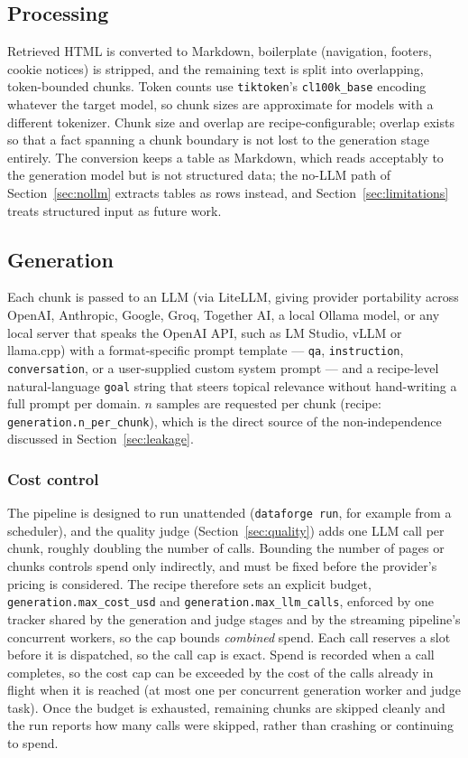 \documentclass[11pt]{article}
\begin{document}
\subsection{Processing}
\label{sec:processing}
Retrieved HTML is converted to Markdown, boilerplate (navigation,
footers, cookie notices) is stripped, and the remaining text is split
into overlapping, token-bounded chunks. Token counts use
\texttt{tiktoken}'s \texttt{cl100k\_base} encoding whatever the target
model, so chunk sizes are approximate for models with a different
tokenizer. Chunk size and overlap are recipe-configurable; overlap exists
so that a fact spanning a chunk boundary is not lost to the generation
stage entirely. The conversion keeps a table as Markdown, which reads
acceptably to the generation model but is not structured data; the
no-LLM path of Section~\ref{sec:nollm} extracts tables as rows instead,
and Section~\ref{sec:limitations} treats structured input as future
work.

\subsection{Generation}
\label{sec:generation}
Each chunk is passed to an LLM (via LiteLLM, giving provider portability
across OpenAI, Anthropic, Google, Groq, Together AI, a local Ollama
model, or any local server that speaks the OpenAI API, such as LM Studio,
vLLM or llama.cpp) with a format-specific prompt template --- \texttt{qa},
\texttt{instruction}, \texttt{conversation}, or a user-supplied custom
system prompt --- and a recipe-level natural-language \texttt{goal}
string that steers topical relevance without hand-writing a full prompt
per domain. $n$ samples are requested per chunk (recipe:
\texttt{generation.n\_per\_chunk}), which is the direct source of the
non-independence discussed in Section~\ref{sec:leakage}.

\subsubsection{Cost control}
\label{sec:budget}
The pipeline is designed to run unattended (\texttt{dataforge run}, for
example from a scheduler), and the quality judge (Section~\ref{sec:quality})
adds one LLM call per chunk, roughly doubling the number of calls. Bounding
the number of pages or chunks controls spend only indirectly, and must be
fixed before the provider's pricing is considered. The recipe therefore
sets an explicit budget, \texttt{generation.max\_cost\_usd} and
\texttt{generation.max\_llm\_calls}, enforced by one tracker shared by the
generation and judge stages and by the streaming pipeline's concurrent
workers, so the cap bounds \emph{combined} spend. Each call reserves a
slot before it is dispatched, so the call cap is exact. Spend is recorded
when a call completes, so the cost cap can be exceeded by the cost of the
calls already in flight when it is reached (at most one per concurrent
generation worker and judge task). Once the budget is exhausted, remaining
chunks are skipped cleanly and the run reports how many calls were
skipped, rather than crashing or continuing to spend.
\end{document}
